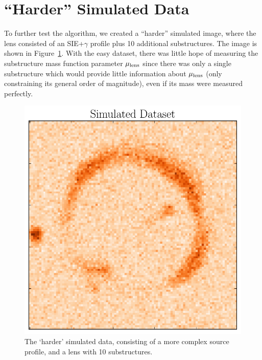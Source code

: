 \documentclass[useAMS,usenatbib]{mn2e}
\newcommand{\revisions}{\color{blue}}
\begin{document}
{\revisions
\section{``Harder'' Simulated Data}
To further test the algorithm, we created a ``harder'' simulated image, where
the lens consisted of an SIE+$\gamma$ profile plus 10 additional substructures.
The image is shown in Figure~\ref{fig:image2}. With the easy dataset, there
was little hope of measuring the substructure mass function parameter
$\mu_{\rm lens}$ since there was only a single substructure which would provide
little information about $\mu_{\rm lens}$ (only constraining its general
order of magnitude), even if its mass were measured perfectly.}

\begin{figure}
\begin{center}
\includegraphics[scale=0.5]{image2.pdf}
\caption{{\revisions The `harder' simulated data, consisting of a more
complex source profile, and a lens with 10 substructures.}
\label{fig:image2}}
\end{center}
\end{figure}
\end{document}
